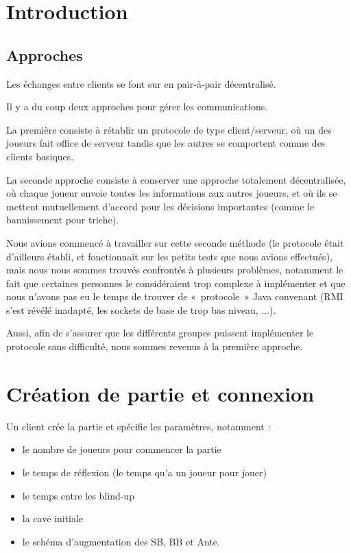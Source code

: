 

\section{Introduction}

\subsection{Approches}

Les échanges entre clients se font sur en pair-à-pair décentralisé.

Il y a du coup deux approches pour gérer les communications.

La première consiste à rétablir un protocole de type client/serveur, où un des joueurs fait office de serveur tandis que les autres se comportent comme des clients basiques.

La seconde approche consiste à conserver une approche totalement décentralisée, où chaque joueur envoie toutes les informations aux autres joueurs, et où ils se mettent mutuellement d'accord pour les décisions importantes (comme le bannissement pour triche).

Nous avions commencé à travailler sur cette seconde méthode (le protocole était d'ailleurs établi, et fonctionnait sur les petits tests que nous avions effectués), mais nous nous sommes trouvés confrontés à plusieurs problèmes, notamment le fait que certaines personnes le considéraient trop complexe à implémenter et que nous n'avons pas eu le temps de trouver de «~protocole~» Java convenant (RMI s'est révélé inadapté, les sockets de base de trop bas niveau, ...).

Aussi, afin de s'assurer que les différents groupes puissent implémenter le protocole sans difficulté, nous sommes revenus à la première approche.

\section{Création de partie et connexion}

Un client crée la partie et spécifie les paramètres, notamment :
\begin{itemize}
	\item le nombre de joueurs pour commencer la partie
	\item le temps de réflexion (le temps qu'a un joueur pour jouer)
	\item le temps entre les blind-up
	\item la cave initiale
	\item le schéma d'augmentation des SB, BB et Ante.
\end{itemize}

